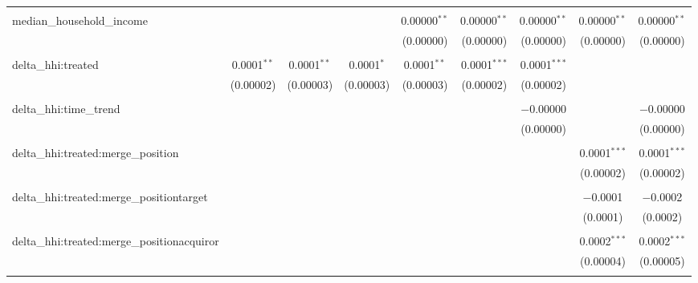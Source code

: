 \begin{table}[H]
{\begin{tabular}{@{\extracolsep{5pt}}lcccccccc}
   & & & & & & & & \\  

  median\_household\_income &  &  &  & 0.00000$^{**}$ & 0.00000$^{**}$ & 0.00000$^{**}$ & 0.00000$^{**}$ & 0.00000$^{**}$ \\  

   &  &  &  & (0.00000) & (0.00000) & (0.00000) & (0.00000) & (0.00000) \\  

   & & & & & & & & \\  

  delta\_hhi:treated & 0.0001$^{**}$ & 0.0001$^{**}$ & 0.0001$^{*}$ & 0.0001$^{**}$ & 0.0001$^{***}$ & 0.0001$^{***}$ &  &  \\  

   & (0.00002) & (0.00003) & (0.00003) & (0.00003) & (0.00002) & (0.00002) &  &  \\  

   & & & & & & & & \\  

  delta\_hhi:time\_trend &  &  &  &  &  & $-$0.00000 &  & $-$0.00000 \\  

   &  &  &  &  &  & (0.00000) &  & (0.00000) \\  

   & & & & & & & & \\  

  delta\_hhi:treated:merge\_position &  &  &  &  &  &  & 0.0001$^{***}$ & 0.0001$^{***}$ \\  

   &  &  &  &  &  &  & (0.00002) & (0.00002) \\  

   & & & & & & & & \\  

  delta\_hhi:treated:merge\_positiontarget &  &  &  &  &  &  & $-$0.0001 & $-$0.0002 \\  

   &  &  &  &  &  &  & (0.0001) & (0.0002) \\  

   & & & & & & & & \\  

  delta\_hhi:treated:merge\_positionacquiror &  &  &  &  &  &  & 0.0002$^{***}$ & 0.0002$^{***}$ \\  

   &  &  &  &  &  &  & (0.00004) & (0.00005) \\  

   & & & & & & & & \\  


\end{tabular}}
\end{table}
